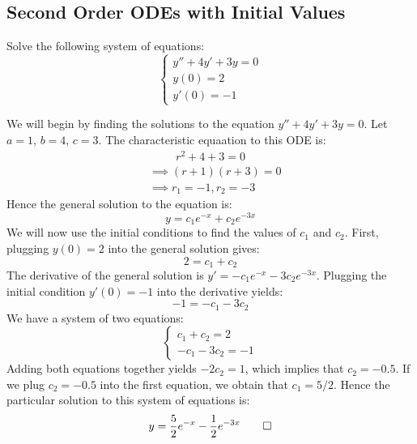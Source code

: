 \subsection{Second Order ODEs with Initial Values}

\begin{example}
   Solve the following system of equations:
   \[ \begin{cases}
      y'' + 4y' + 3y = 0 \\
      y(0) = 2 \\
      y'(0) = -1 
      \end{cases} \]
\end{example}
\begin{solution}
   We will begin by finding the solutions to the equation $y'' + 4y' + 3y = 0$. Let $a = 1$, $b = 4$, $c = 3$. The characteristic equaation to this ODE is:
   \begin{align*}
      &\hspace{1cm} r^2 + 4 + 3 = 0 \\
      &\implies (r + 1)(r + 3) = 0 \\
      &\implies r_1 = -1, r_2 = -3
   \end{align*}
   Hence the general solution to the equation is:
   \[ y = c_1e^{-x} + c_2e^{-3x} \]
   We will now use the initial conditions to find the values of $c_1$ and $c_2$. First, plugging $y(0) = 2$ into the general solution gives:
    \[  2  = c_1 + c_2 \]
     The derivative of the general solution is $y' = -c_1e^{-x} -3c_2e^{-3x}$. Plugging the initial condition $y'(0) = -1$ into the derivative yields:
     \[ -1 = -c_1 - 3c_2 \]
   We have a system of two equations:
   \[ \begin{cases}
      c_1 + c_2 = 2 \\
      -c_1 - 3c_2 = -1
   \end{cases} \]
   Adding both equations together yields $-2c_2 = 1$, which implies that $c_2 = -0.5$. If we plug $c_2 = -0.5$ into the first equation, we obtain that $c_1 = 5/2$. Hence the particular solution to this system of equations is:
   \[ y = \frac{5}{2}e^{-x} - \frac{1}{2}e^{-3x} \qedhere \]
\end{solution}


